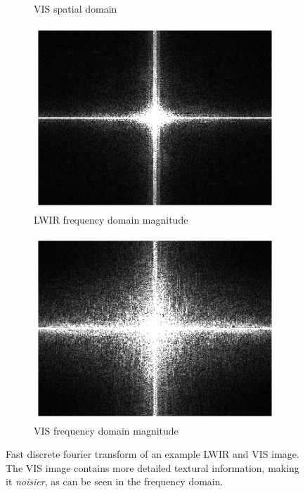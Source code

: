 \documentclass{l4proj}
\begin{document}
\begin{figure}[ht]
\begin{subfigure}[h!]{0.4\textwidth}
    \caption{VIS spatial domain}
    \label{fig:fourier_vis_spatial}
  \end{subfigure}
  \begin{subfigure}[h!]{0.4\textwidth}
    \includegraphics[width=\textwidth]{images/fourier/lwir_freq}
    \caption{LWIR frequency domain magnitude}
    \label{fig:fourier_lwir_freq}
  \end{subfigure}
  \begin{subfigure}[h!]{0.4\textwidth}
      \includegraphics[width=\textwidth]{images/fourier/gray_freq}
      \caption{VIS frequency domain magnitude}
      \label{fig:fourier_vis_freq}
    \end{subfigure}
  \caption{Fast discrete fourier transform of an example LWIR and VIS image. The VIS image contains more detailed textural information, making it \textit{noisier}, as can be seen in the frequency domain.}
  \label{fig:fourier}
\end{figure}
\end{document}
